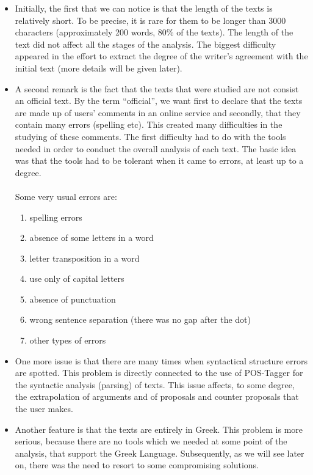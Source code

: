 \begin{itemize}
  \item Initially, the first that we can notice is that the length of the texts is 	relatively short. To be precise, it is rare for them to be longer than 3000 characters (approximately 200 words, 80\% of the texts). The length of the text did not affect all the stages of the analysis. The biggest difficulty appeared in the effort to extract the degree of the writer's agreement with the initial text (more details will be given later).\\
  
  \item A second remark is the fact that the texts that were studied are not consist an official text. By the term ``official'', we want first to declare that the texts are made up of users' comments in an online service and secondly, that they contain many errors (spelling etc). This created many difficulties in the studying of these comments. The first difficulty had to do with the tools needed in order to conduct the overall analysis of each text. The basic idea was that the tools had to be tolerant when it came to errors, at least up to a degree.\\
\\
Some very usual errors are:

  	\begin{enumerate}
  	\item spelling errors
  	\item absence of some letters in a word
  	\item letter transposition in a word
  	\item use only of capital letters
  	\item absence of punctuation
  	\item wrong sentence separation (there was no gap after the dot)
  	\item other types of errors\\
	\end{enumerate}

  \item One more issue is  that there are many times when syntactical structure errors are 	spotted. This problem is directly connected to the use of POS-Tagger for the syntactic analysis (parsing) of texts. This issue affects, to some degree, the extrapolation of arguments and of proposals and counter proposals that the user makes.\\
  
  \item Another feature is that the texts are entirely in Greek. This problem is more 	serious, because there are no tools which we needed at some point of the analysis, that support the Greek Language. Subsequently, as we will see later on, there was the need to resort to some compromising solutions.\\
  

\end{itemize}
